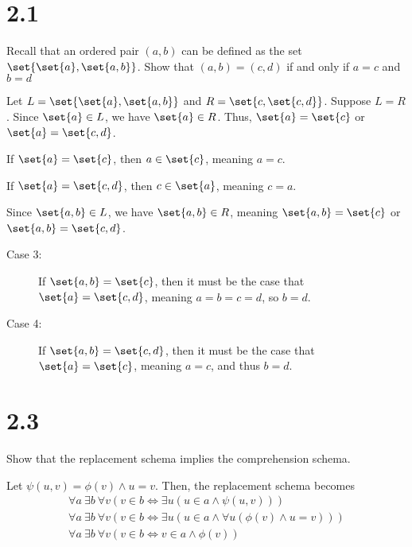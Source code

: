 \documentclass[10pt]{mypackage}
\begin{document}
\RaggedRight
\section{2.1}%
\begin{problem}
  \normalsize
  Recall that an ordered pair $(a,b)$ can be defined as the set $\set{\set{a},\set{a,b}}$. Show that $(a,b) = (c,d)$ if and only if $a=c$ and $b=d$
\end{problem}
\begin{solution}
  Let $L = \set{\set{a},\set{a,b}}$ and $R = \set{c,\set{c,d}}$. Suppose $L = R$. Since $\set{a}\in L$, we have $\set{a}\in R$. Thus, $\set{a} = \set{c}$ or $\set{a} = \set{c,d}$.
  \begin{description}[leftmargin=0pt]
    \item[Case 1:] If $\set{a} = \set{c}$, then $a\in \set{c}$, meaning $a = c$.
    \item[Case 2:] If $\set{a} = \set{c,d}$, then $c\in \set{a}$, meaning $c = a$.
  \end{description}
  Since $\set{a,b}\in L$, we have $\set{a,b} \in R$, meaning $\set{a,b} = \set{c}$ or $\set{a,b} = \set{c,d}$.
  \begin{description}
    \item[Case 3:] If $\set{a,b} = \set{c}$, then it must be the case that $\set{a} = \set{c,d}$, meaning $a = b = c = d$, so $b = d$.
    \item[Case 4:] If $\set{a,b} = \set{c,d}$, then it must be the case that $\set{a} = \set{c}$, meaning $a = c$, and thus $b = d$.
  \end{description}
\end{solution}
\section{2.3}%
\begin{problem}
  Show that the replacement schema implies the comprehension schema.
\end{problem}
\begin{solution}
  Let $\psi(u,v) = \phi(v) \wedge u = v$. Then, the replacement schema becomes
  \begin{align*}
    \forall a\: \exists b\:\forall v\left(v\in b \Leftrightarrow \exists u\left(u\in a \wedge \psi(u,v)\right)\right)\\
    \forall a\: \exists b \:\forall v \left(v\in b \Leftrightarrow \exists u \left(u\in a \wedge \forall u\left(\phi(v) \wedge u = v\right)\right)\right)\\
    \forall a\:\exists b \: \forall v \left(v\in b \Leftrightarrow v\in a \wedge \phi(v)\right)
  \end{align*}
\end{solution}
\end{document}
